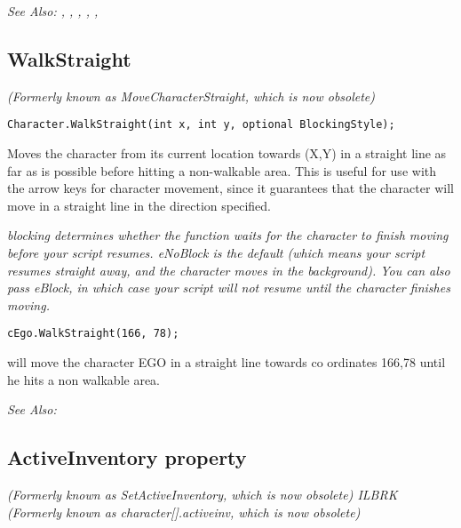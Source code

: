 \it{See Also:} ,
,
,
,
,


\subsection{WalkStraight}\label{Character.WalkStraight}%

\it{(Formerly known as MoveCharacterStraight, which is now obsolete)}

\begin{verbatim}
Character.WalkStraight(int x, int y, optional BlockingStyle);
\end{verbatim}
Moves the character from its current location towards (X,Y) in a straight
line as far as is possible before hitting a non-walkable area. This is
useful for use with the arrow keys for character movement, since it
guarantees that the character will move in a straight line in the direction
specified.

\it{blocking} determines whether the function waits for the character to finish moving
before your script resumes. eNoBlock is the default (which means your script
resumes straight away, and the character moves in the background). You can also pass
eBlock, in which case your script will not resume until the character finishes moving.

\begin{verbatim}
cEgo.WalkStraight(166, 78);
\end{verbatim}
will move the character EGO in a straight line towards co ordinates 166,78 until he
hits a non walkable area.

\it{See Also:} 


\subsection{ActiveInventory property}\label{Character.ActiveInventory}%

\it{(Formerly known as SetActiveInventory, which is now obsolete)} ILBRK
\it{(Formerly known as character[].activeinv, which is now obsolete)}

